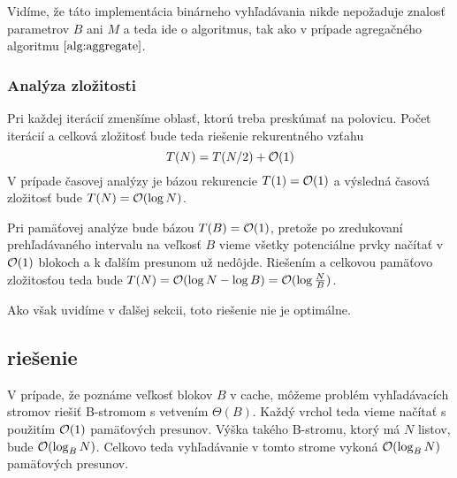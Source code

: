 Vidíme, že táto implementácia binárneho vyhľadávania nikde nepožaduje znalosť parametrov $B$ ani $M$ a teda ide o \obliv algoritmus, tak ako v prípade agregačného algoritmu $\ref{alg:aggregate}$.

\subsubsection{Analýza zložitosti}
Pri každej iterácií zmenšíme oblasť, ktorú treba preskúmať na polovicu. Počet iterácií a celková zložitosť bude teda riešenie rekurentného vzťahu
\[
T(N) = T(N/2) + \mathcal{O}(1)
\]
V prípade časovej analýzy je bázou rekurencie $T(1) = \mathcal{O}(1)$ a výsledná časová zložitosť bude $T(N) = \mathcal{O}(\log N)$.

Pri pamäťovej analýze bude bázou $T(B) = \mathcal{O}(1)$, pretože po zredukovaní prehľadávaného intervalu na veľkosť $B$ vieme všetky potenciálne prvky načítať v $\mathcal{O}(1)$ blokoch a k ďalším presunom už nedôjde. Riešením a celkovou pamäťovo zložitosťou teda bude $T(N) = \mathcal{O}(\log{N}-\log{B}) = \mathcal{O}(\log{\frac{N}{B}})$.

Ako však uvidíme v ďalšej sekcii, toto riešenie nie je optimálne.




\subsection{\Aware riešenie} \label{sec:static-aware}
V prípade, že poznáme veľkosť blokov $B$ v cache, môžeme problém vyhľadávacích stromov riešiť B-stromom \citep{bayerbtree} s vetvením $\Theta(B)$. Každý vrchol teda vieme načítať s použitím $\mathcal{O}(1)$ pamäťových presunov. Výška takého B-stromu, ktorý má $N$ listov, bude $\mathcal{O}(\log_B{N})$. Celkovo teda vyhľadávanie v tomto strome vykoná $\mathcal{O}(\log_B{N})$ pamäťových presunov.

